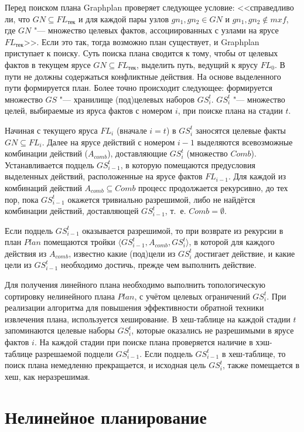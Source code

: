 \documentclass[b5paper,11pt]{book}
\numberwithin{Def}{section}
\numberwithin{Th}{chapter}
\numberwithin{St}{chapter}
\begin{document}
	Перед поиском плана Graphplan проверяет следующее условие: <<справедливо ли, что $GN\subseteq FL_{\text{тек}}$ и для каждой пары узлов $gn_1,gn_2\in GN$ и $gn_1,gn_2\not\in mxf$, где $GN$ "--- множество целевых фактов, ассоциированных с узлами на ярусе $FL_{\text{тек}}$>>. Если это так, тогда возможно план существует, и Graphplan приступает к поиску. Суть поиска плана сводится к тому, чтобы от целевых фактов в текущем ярусе $GN\subseteq FL_{\text{тек}}$, выделить путь, ведущий к ярусу $FL_0$. В пути не
	должны содержаться конфликтные действия. На основе выделенного пути	формируется план. Более точно происходит следующее: формируется множество $GS$ "--- хранилище (под)целевых наборов $GS_i^t$. $GS_i^t$ "--- множество целей, выбираемые из яруса фактов с номером $i$,
	при поиске плана на стадии $t$.
	
	Начиная с текущего яруса $FL_i$ (вначале $i = t$) в $GS_i^t$ заносятся целевые факты $GN\subseteq FL_i$. Далее на ярусе действий с номером $i-1$ выделяются всевозможные комбинации действий ($A_{comb}$), доставляющие $GS_i^t$ (множество $Comb$). Устанавливается подцель $GS_{i-1}^t$, в которую помещаются предусловия выделенных действий, расположенные на ярусе фактов $FL_{i-1}$. Для каждой из комбинаций действий $A_{comb}\subseteq Comb$ процесс продолжается рекурсивно, до тех пор, пока $GS_{i-1}^t$ окажется тривиально разрешимой, либо не найдётся комбинации действий, доставляющей $GS_{i-1}^t$, т.~е. $Comb = \emptyset$.
	
	Если подцель $GS_{i-1}^t$ оказывается разрешимой, то при возврате из рекурсии в план $Plan$ помещаются тройки $\langle GS_{i-1}^t, A_{comb}, GS_i^t\rangle$, в которой для каждого действия из $A_{comb}$, известно какие (под)цели из $GS_i^t$ достигает действие, и какие цели из $GS_{i-1}^t$ необходимо достичь, прежде чем выполнить действие. 
	
	Для получения линейного плана необходимо выполнить топологическую сортировку нелинейного плана $Plan$, с учётом целевых ограничений $GS_i^t$. При реализации алгоритма для повышения эффективности обратной техники извлечения плана, используется хеширование. В хеш-таблице на каждой стадии $t$ запоминаются целевые наборы $GS_i^t$, которые оказались не разрешимыми в ярусе фактов $i$. На каждой стадии при поиске плана проверяется наличие в хэш-таблице разрешаемой подцели $GS_{i-1}^t$. Если подцель $GS_{i-1}^t$ в хеш-таблице, то поиск плана немедленно прекращается, и исходная цель $GS_i^t$, также помещается в хеш, как неразрешимая.
	
	\section{Нелинейное планирование}
\end{document}
